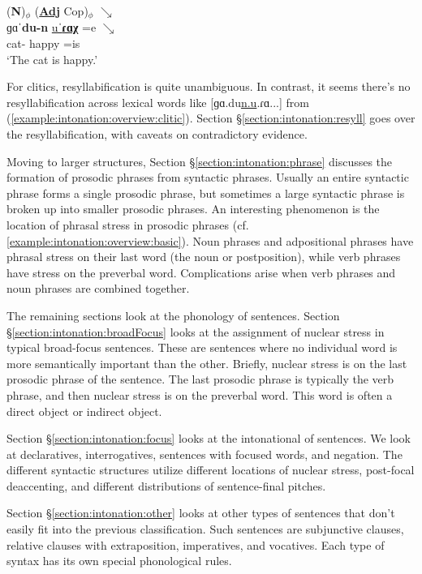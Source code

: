 \begin{exe}
	\ex \glll (\textbf{N})$_\phi$ (\underline{\textbf{Adj}} Cop)$_\phi$ $\searrow$ \\
	ɡɑˈ\textbf{du-n} \underline{uˈ\textbf{ɾɑχ}} =e  $\searrow$ \\
	cat-{} happy =is\\
	\trans `The   cat is happy.' \label{example:intonation:overview:clitic}
	\\ 
\end{exe}

For clitics, resyllabification is quite unambiguous. In contrast, it seems there's no resyllabification across lexical words like [ɡɑ.du\underline{n.u}.ɾɑ...] from (\ref{example:intonation:overview:clitic}). Section \S\ref{section:intonation:resyll} goes over the resyllabification, with caveats on contradictory evidence. 

Moving to larger structures, Section \S\ref{section:intonation:phrase} discusses the formation of prosodic phrases from syntactic phrases. Usually an entire syntactic phrase forms a single prosodic phrase, but sometimes   a large syntactic phrase is broken up into smaller prosodic phrases. An interesting phenomenon is the location of phrasal stress in prosodic phrases (cf. \ref{example:intonation:overview:basic}). Noun phrases and adpositional phrases have phrasal stress on their last word (the noun or postposition), while verb phrases have stress on the preverbal word. Complications arise when verb phrases and noun phrases are combined together. 

The remaining sections look at the phonology of sentences. Section \S\ref{section:intonation:broadFocus} looks at the assignment of nuclear stress in typical broad-focus sentences. These are sentences where no individual word is more semantically important than the other. Briefly, nuclear stress is on the last prosodic phrase of the sentence. The last prosodic phrase is typically the verb phrase, and then nuclear stress is on the preverbal word. This word is often a direct object or indirect object.


Section \S\ref{section:intonation:focus} looks at the intonational of sentences. We look at declaratives, interrogatives, sentences with focused words, and negation. The different syntactic structures utilize different locations of nuclear stress,     post-focal deaccenting, and different distributions of sentence-final pitches. 

Section \S\ref{section:intonation:other} looks at other types of sentences that don't easily fit into the previous classification. Such sentences are subjunctive clauses, relative clauses with extraposition, imperatives, and vocatives. Each type of syntax has its own special phonological rules. 





